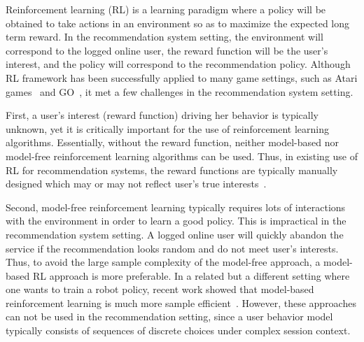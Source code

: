 \documentclass{article} %
\begin{document}
Reinforcement learning (RL) is a learning paradigm where a policy will be obtained to take actions in an environment so as to maximize the expected long term reward. In the recommendation system setting, the environment will correspond to the logged online user, the reward function will be the user's interest, and the policy will correspond to the recommendation policy. Although RL framework has been successfully applied to many game settings, such as Atari games~\citep{MniKavSilRusetal15} and GO~\citep{SilHuaMadGueetal16}, it met a few challenges in the recommendation system setting. 

First, a user's interest (reward function) driving her behavior is typically unknown, yet it is critically important for the use of reinforcement learning algorithms. Essentially, without the reward function, neither model-based nor model-free reinforcement learning algorithms can be used. Thus, in existing use of RL for recommendation systems, the reward functions are typically manually designed which may or may not reflect user's true interests~\citep{zhao2018deep,zheng2018drn}.

Second, model-free reinforcement learning typically requires lots of interactions with the environment in order to learn a good policy. This is impractical in the recommendation system setting. A logged online user will quickly abandon the service if the recommendation looks random and do not meet user's interests. Thus, to avoid the large sample complexity of the model-free approach, a model-based RL approach is more preferable.
In a related but a different setting where one wants to train a robot policy, recent work showed that model-based reinforcement learning is much more sample efficient~\citep{NagabandiKahn17, DeisenrothFox15, IgnasiPieter18}. However, these approaches can not be used in the recommendation setting, since a user behavior model typically consists of sequences of discrete choices under complex session context.   
\end{document}
